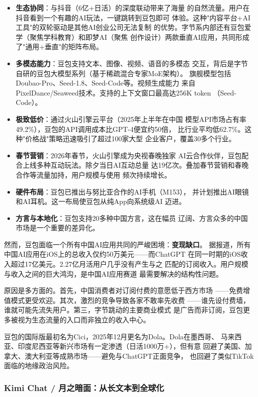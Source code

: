 \begin{itemize}
  \item \textbf{生态协同}：与抖音（6亿+日活）的深度联动带来了海量
    的自然流量。用户在抖音看到一个有趣的AI玩法，一键跳转到豆包即可
    体验。这种"内容平台+AI工具"的双轮驱动是其他AI创业公司无法复制
    的优势。字节系内部还有豆包爱学（聚焦学科教育）和即梦AI（聚焦
    创作设计）两款垂直AI应用，共同形成了"通用+垂直"的矩阵布局。
  \item \textbf{多模态能力}：豆包支持文本、图像、视频、语音的多模态
    交互，背后是字节自研的豆包大模型系列（基于稀疏混合专家MoE架构）。
    旗舰模型包括Doubao-Pro、Seed-1.8、Seed-Code等。视频生成能力
    来自PixelDance/Seaweed技术。支持的上下文窗口最高达256K token
    （Seed-Code）。
  \item \textbf{极致低价}：通过火山引擎云平台（2025年上半年在中国
    模型API市场占有率49.2\%），豆包的API调用成本比GPT-4便宜约50倍，
    比行业平均低62.7\%。这种"价格战"策略迅速吸引了超过100家大型
    企业客户，覆盖30多个行业。
  \item \textbf{春节营销}：2026年春节，火山引擎成为央视春晚独家
    AI云合作伙伴，豆包配合上线多种互动玩法。除夕当日AI互动总量
    达19亿次。叠加春节营销和春晚合作等流量加持，用户规模与使用
    频次持续增长。
  \item \textbf{硬件布局}：豆包已推出与努比亚合作的AI手机（M153），
    并计划推出AI眼镜和AI耳机。这一布局使豆包从纯App向系统级AI
    迈进。
  \item \textbf{方言与本地化}：豆包支持20多种中国方言，这在幅员
    辽阔、方言众多的中国市场是一个重要的差异化。
\end{itemize}

然而，豆包面临一个所有中国AI应用共同的严峻困境：\textbf{变现缺口}。
据报道，所有中国AI应用在iOS上的总收入仅约50万美元——而ChatGPT
在同一时期的iOS收入超过17亿美元。2.27亿月活用户几乎没有产生与之
匹配的订阅收入。用户规模与收入之间的巨大鸿沟，是中国AI应用赛道
最需要解决的结构性问题。

原因是多方面的。首先，中国消费者对订阅付费的意愿低于西方市场
——免费增值模式更受欢迎。其次，激烈的竞争导致各家不敢率先收费
——谁先设付费墙，谁就可能先流失用户。第三，字节跳动的主要商业模式
是广告而非订阅，豆包更多被视为生态流量的入口而非独立的收入中心。

豆包的国际版最初名为Cici，2025年12月更名为Dola。Dola在墨西哥、
马来西亚、印度尼西亚等新兴市场有一定渗透（日活1000万+），但有意
回避了美国、加拿大、澳大利亚等成熟市场——避免与ChatGPT正面竞争，
也回避了类似TikTok面临的地缘政治风险。

\subsubsection{Kimi Chat / 月之暗面：从长文本到全球化}


